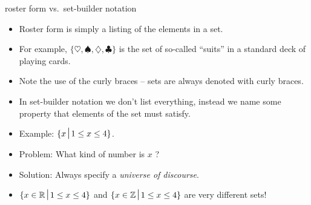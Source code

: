 \documentclass[landscape]{beamer}
\begin{document}
\begin{frame}{roster form vs.\ set-builder notation}
\begin{itemize}
\item Roster form is simply a listing of the elements in a set. \pause
\item For example, $\{ \heartsuit, \spadesuit, \diamondsuit, \clubsuit \}$ is the set of so-called ``suits'' in a standard deck of playing cards. \pause
\item Note the use of the curly braces -- sets are always denoted with curly braces.\pause
\item In set-builder notation we don't list everything, instead we name some property that elements of the set must satisfy. \pause
\item Example: $\{ x \suchthat 1 \leq x \leq 4 \}$.\pause
\item Problem: What kind of number is $x$ ? \pause
\item Solution: Always specify a {\em universe of discourse}. \pause
\item $\{ x \in \Reals \suchthat 1 \leq x \leq 4 \}$ and $\{ x \in \Integers \suchthat 1 \leq x \leq 4 \}$ are very different sets!
\end{itemize}
\end{frame}
\end{document}
